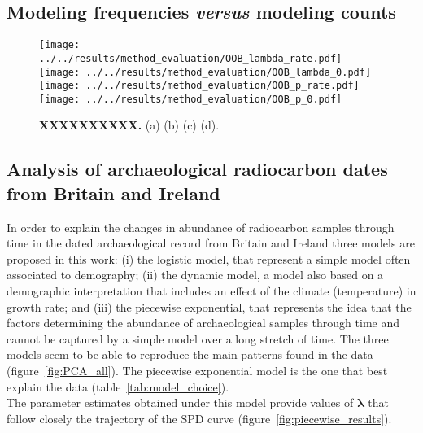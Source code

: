\documentclass[a4paper]{article}
\begin{document}
\subsection*{Modeling frequencies \emph{versus} modeling counts}

\begin{figure}[tbh]
\center\texttt{[image: ../../results/method\_evaluation/OOB\_lambda\_rate.pdf]} \texttt{[image: ../../results/method\_evaluation/OOB\_lambda\_0.pdf]} \texttt{[image: ../../results/method\_evaluation/OOB\_p\_rate.pdf]}
\texttt{[image: ../../results/method\_evaluation/OOB\_p\_0.pdf]}
\caption{\textbf{XXXXXXXXXX.} (a) (b) (c) (d).}
\label{fig:freq_vs_counts}
\end{figure}


\subsection*{Analysis of archaeological radiocarbon dates from Britain and Ireland}


In order to explain the changes in abundance of radiocarbon samples through time in the dated archaeological record from Britain and Ireland three models are proposed in this work: (i) the logistic model, that represent a simple model often associated to demography; (ii) the dynamic model, a model also based on a demographic interpretation that includes an effect of the climate (temperature) in growth rate; and (iii) the piecewise exponential, that represents the idea that the factors determining the abundance of archaeological samples through time and cannot be captured by a simple model over a long stretch of time. The three models seem to be able to reproduce the main patterns found in the data (figure~\ref{fig:PCA_all}). The piecewise exponential model is the one that best explain the data (table~\ref{tab:model_choice}).
\\


The parameter estimates obtained under this model provide values of $\bm{\lambda}$ that follow closely the trajectory of the SPD curve (figure~\ref{fig:piecewise_results}). 
\\




\end{document}
